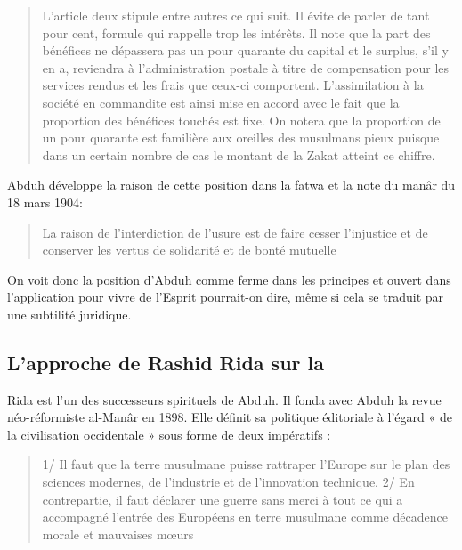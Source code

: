 \begin{quote}
    L'article deux stipule entre autres ce qui suit. Il évite de parler de tant pour
cent, formule qui rappelle trop les intérêts. Il note que la part des bénéfices ne
dépassera pas un pour quarante du capital et le surplus, s'il y en a, reviendra à
l'administration postale à titre de compensation pour les services rendus et les
frais que ceux-ci comportent. L'assimilation à la société en commandite est ainsi
mise en accord avec le fait que la proportion des bénéfices touchés est fixe. On
notera que la proportion de un pour quarante est familière aux oreilles des
musulmans pieux puisque dans un certain nombre de cas le montant de la Zakat
atteint ce chiffre.
\end{quote}


Abduh développe la raison de cette position dans la fatwa et la note du manâr du 18 mars 1904: 
\begin{quote}
    La raison de l'interdiction de l'usure est de faire cesser l'injustice et de conserver les vertus de solidarité et de bonté mutuelle
\end{quote}
On voit donc la position d'Abduh comme ferme dans les principes et ouvert dans l'application pour vivre de l'Esprit pourrait-on dire, même si cela se traduit par une subtilité juridique.


\subsection{L'approche de Rashid Rida sur la \riba} 

Rida est l'un des successeurs spirituels de Abduh. Il fonda avec Abduh la revue néo-réformiste al-Manâr en   1898. Elle définit sa politique éditoriale à l’égard « de la civilisation occidentale » sous forme de deux impératifs : 
\begin{quote}
    \item  1/ Il faut que la terre musulmane puisse rattraper l’Europe sur le plan des sciences modernes, de l’industrie et de l’innovation technique. 
    \textbf{ }2/ En contrepartie, il faut déclarer une guerre sans merci à tout ce qui a accompagné l’entrée des Européens en terre musulmane comme décadence morale et mauvaises mœurs
\end{quote}

